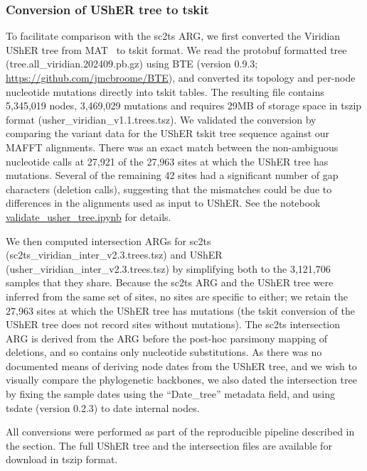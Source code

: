\documentclass[12pt]{article}
\begin{document}
\subsubsection*{Conversion of UShER tree to tskit}
To facilitate comparison with the sc2ts ARG, we first converted the Viridian
UShER tree from MAT~\cite{McBroome2021} to tskit format.
We read the protobuf formatted tree (tree.all\_viridian.202409.pb.gz)
using BTE (version 0.9.3; \url{https://github.com/jmcbroome/BTE}),
and converted its topology and per-node nucleotide mutations
directly into tskit tables.
The resulting file
 contains 5,345,019 nodes, 3,469,029
mutations and requires 29MB of storage space in tszip format (usher\_viridian\_v1.1.trees.tsz).
We validated the conversion by comparing the
variant data for the UShER tskit tree sequence against our MAFFT alignments.
There was an exact match between the non-ambiguous nucleotide calls
at 27,921 of the 27,963 sites at which the UShER tree has mutations.
Several of the remaining 42 sites had a significant
number of gap characters (deletion calls), suggesting that the mismatches
could be due to differences in the alignments used as input to UShER.
See the notebook
\href{https://github.com/jeromekelleher/sc2ts-paper/blob/main/notebooks/validate\_usher\_tree.ipynb}{validate\_usher\_tree.ipynb}
for details.

We then computed intersection ARGs for
sc2ts (sc2ts\_viridian\_inter\_v2.3.trees.tsz) and
UShER (usher\_viridian\_inter\_v2.3.trees.tsz)
by simplifying \cite{Kelleher2018efficient,Wong2024}
both to the 3,121,706 samples that they share.
Because the sc2ts ARG and the UShER tree were inferred from
the same set of sites, no sites are specific to either;
we retain the 27,963 sites at which the UShER tree has mutations
(the tskit conversion of the UShER tree does not record sites without mutations).
The sc2ts intersection ARG is derived from the ARG before the post-hoc
parsimony mapping of deletions, and so
contains only nucleotide substitutions.
As there was no documented means of deriving node dates from
the UShER tree, and we wish to visually compare
the phylogenetic backbones,
we also dated the intersection tree by fixing
the sample dates using the ``Date\_tree'' metadata field,
and using tsdate (version 0.2.3) to date internal nodes.

All conversions were performed as part of the reproducible
pipeline described in the  section.
The full UShER tree and the intersection files are available for download
in tszip format. %
\end{document}
